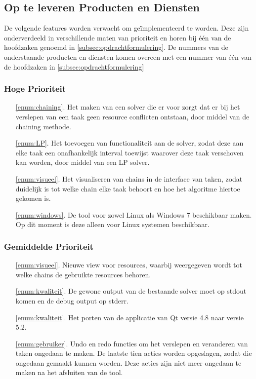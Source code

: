 \subsection{Op te leveren Producten en Diensten}
\label{subsec:producten}
De volgende features worden verwacht om ge\"implementeerd te worden. Deze zijn onderverdeeld in verschillende maten van prioriteit en horen bij \'e\'en van de hoofdzaken genoemd in \ref{subsec:opdrachtformulering}. De nummers van de onderstaande producten en diensten komen overeen met een nummer van \'e\'en van de hoofdzaken in \ref{subsec:opdrachtformulering}

\subsubsection*{Hoge Prioriteit}
\begin{itemize}
	\item[\ref{enum:chaining}.] Het maken van een solver die er voor zorgt dat er bij het verslepen van een taak geen resource conflicten ontstaan, door middel van de chaining methode.
	\item[\ref{enum:LP}.] Het toevoegen van functionaliteit aan de solver, zodat deze aan elke taak een onafhankelijk interval toewijst waarover deze taak verschoven kan worden, door middel van een LP solver.
	\item[\ref{enum:visueel}.] Het visualiseren van chains in de interface van taken, zodat duidelijk is tot welke chain elke taak behoort en hoe het algoritme hiertoe gekomen is.
	\item[\ref{enum:windows}.] De tool voor zowel Linux als Windows 7 beschikbaar maken. Op dit moment is deze alleen voor Linux systemen beschikbaar.
\end{itemize}

\subsubsection*{Gemiddelde Prioriteit}
\begin{itemize}
	\item[\ref{enum:visueel}.] Nieuwe view voor resources, waarbij weergegeven wordt tot welke chains de gebruikte resources behoren.
	\item[\ref{enum:kwaliteit}.] De gewone output van de bestaande solver moet op stdout komen en de debug output op stderr.
	\item[\ref{enum:kwaliteit}.] Het porten van de applicatie van Qt versie 4.8 naar versie 5.2.
	\item[\ref{enum:gebruiker}.] Undo en redo functies om het verslepen en veranderen van taken ongedaan te maken. De laatste tien acties worden opgeslagen, zodat die ongedaan gemaakt kunnen worden. Deze acties zijn niet meer ongedaan te maken na het afsluiten van de tool.
\end{itemize}

